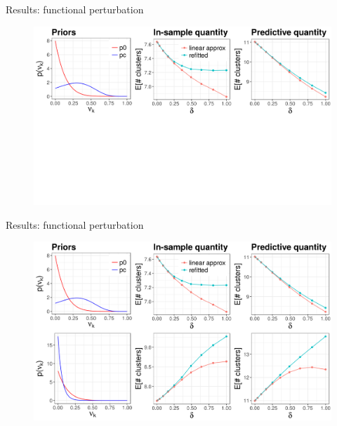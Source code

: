\documentclass[10pt]{beamer}\usepackage[]{graphicx}\usepackage[]{color}
\newenvironment{knitrout}{}{} %
\begin{document}
\begin{frame}{Results: functional perturbation}
\begin{figure}
\centering
\begin{knitrout}
\color{fgcolor}
{\centering \includegraphics[width=0.98\linewidth,height=0.588\linewidth]{masked_results_fig/func_sens_masked2} 
}
\end{knitrout}
\end{figure}
\end{frame}


\begin{frame}{Results: functional perturbation}
\begin{figure}
\centering

\begin{knitrout}
\color{fgcolor}

{\centering \includegraphics[width=0.98\linewidth,height=0.588\linewidth]{figure/functional_sens_plot_thresh0-1} 

}



\end{knitrout}
\end{figure}

\end{frame}
\end{document}
